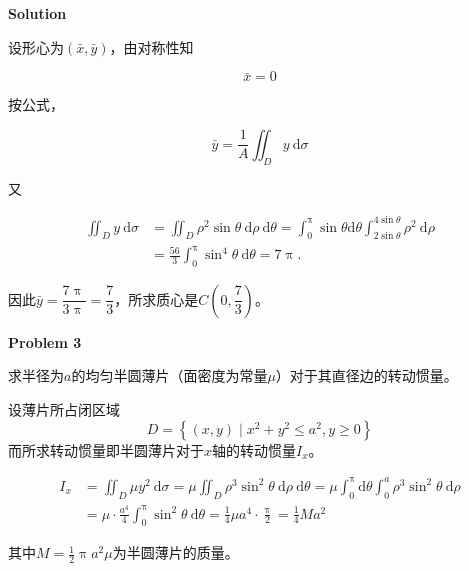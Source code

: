 \documentclass[12pt, a4paper]{article}
\numberwithin{equation}{section}
\begin{document}
    \textbf{Solution}
    \vspace{1em}

    设形心为\(\left(\bar{x}, \bar{y}\right)\)，由对称性知
    
    \[
        \bar{x} = 0
    \]

    按公式，

    $$
        \bar{y}=\frac{1}{A} \iint_D y \mathrm{~d} \sigma
    $$

    又

    $$
        \begin{aligned}
            \iint_D y \mathrm{~d} \sigma & =\iint_D \rho^2 \sin \theta \mathrm{~d} \rho \mathrm{~d} \theta
            =\int_0^\uppi \sin \theta \mathrm{d} \theta \int_{2 \sin \theta}^{4 \sin \theta} \rho^2 \mathrm{~d} \rho \\
            & =\frac{56}{3} \int_0^\uppi \sin ^4 \theta \mathrm{~d} \theta=7 \uppi .
        \end{aligned}
    $$

    因此$\bar{y}=\dfrac{7 \uppi}{3 \uppi}=\dfrac{7}{3}$，所求质心是$C\left(0, \dfrac{7}{3}\right)$。
    \vspace{1em}

    \textbf{Problem 3}
    \vspace{1em}

    求半径为\(a\)的均匀半圆薄片（面密度为常量\(\mu\)）对于其直径边的转动惯量。
    \vspace{1em}

    设薄片所占闭区域\[D = \left\{\left(x,y\right) \mid x^2+y^2 \leq a^2, y \geq 0\right\}\]
    而所求转动惯量即半圆薄片对于\(x\)轴的转动惯量\(I_x\)。

    $$
        \begin{aligned}
            I_x & =\iint_D \mu y^2 \mathrm{~d} \sigma=\mu \iint_D \rho^3 \sin ^2 \theta \mathrm{~d} \rho \mathrm{~d} \theta
            =\mu \int_0^\uppi \mathrm{d} \theta \int_0^a \rho^3 \sin ^2 \theta \mathrm{~d} \rho \\
            & =\mu \cdot \frac{a^4}{4} \int_0^\uppi \sin ^2 \theta \mathrm{~d} \theta
            =\frac{1}{4} \mu a^4 \cdot \frac{\uppi}{2}=\frac{1}{4} M a^2
        \end{aligned}
    $$

    其中$M=\frac{1}{2} \uppi a^2 \mu$为半圆薄片的质量。
\end{document}

